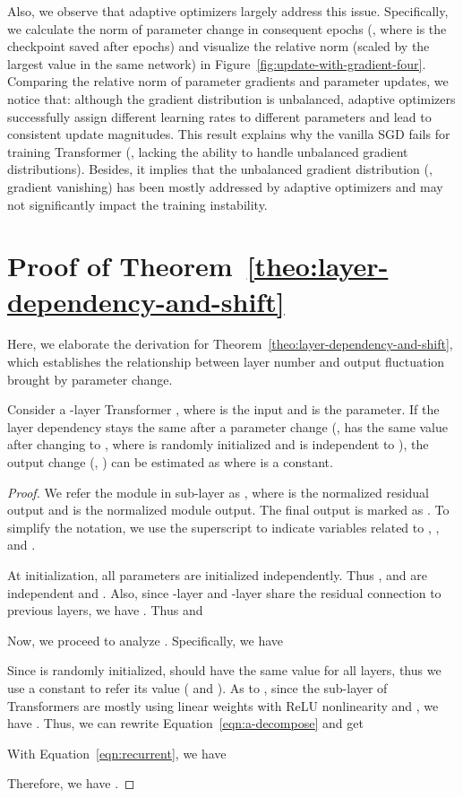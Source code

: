 Also, we observe that adaptive optimizers largely address this issue. 
Specifically, we calculate the norm of parameter change in consequent epochs (\eg,  where  is the checkpoint saved after  epochs) and visualize the relative norm (scaled by the largest value in the same network) in Figure~\ref{fig:update-with-gradient-four}.  
Comparing the relative norm of parameter gradients and parameter updates, we notice that: although the gradient distribution is unbalanced, adaptive optimizers successfully assign different learning rates to different parameters and lead to consistent update magnitudes. 
This result explains why the vanilla SGD fails for training Transformer (\ie, lacking the ability to handle unbalanced gradient distributions). 
Besides, it implies that the unbalanced gradient distribution (\eg, gradient vanishing) has been mostly addressed by adaptive optimizers and may not significantly impact the training instability. 

\section{Proof of Theorem~\ref{theo:layer-dependency-and-shift}}
\label{appendix:theo2}

Here, we elaborate the derivation for Theorem~\ref{theo:layer-dependency-and-shift}, which establishes the relationship between layer number and output fluctuation brought by parameter change. 

\begin{theorem}
Consider a -layer Transformer , where  is the input and  is the parameter. 
If the layer dependency stays the same after a parameter change 
(\ie,  has the same value after changing  to , where  is randomly initialized and  is independent to ), the output change (\ie, ) can be estimated as  where  is a constant.
\end{theorem}

\begin{proof}

We refer the module in  sub-layer as , where  is the normalized residual output and  is the normalized module output. 
The final output is marked as .
To simplify the notation, we use the superscript  to indicate variables related to , \eg,  and .

At initialization, all parameters are initialized independently.
Thus ,  and  are independent and . 
Also, since -layer and -layer share the residual connection to previous layers,  we have .
Thus  and 


Now, we proceed to analyze . Specifically, we have

Since  is randomly initialized,  should have the same value for all layers, thus we use a constant  to refer its value ( and ). 
As to , since the sub-layer of Transformers are mostly using linear weights with ReLU nonlinearity and , we have . 
Thus, we can rewrite Equation~\ref{eqn:a-decompose} and get  

With Equation~\ref{eqn:recurrent}, we have

Therefore, we have .
\end{proof}

